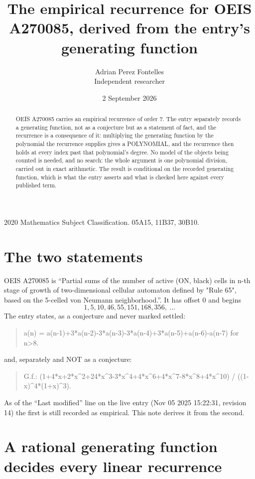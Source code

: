 \documentclass[11pt,a4paper]{article}
\title{The empirical recurrence for OEIS A270085, derived from the entry's generating function}
\author{Adrian Perez Fontelles\\ \small Independent researcher}
\date{2 September 2026}
\theoremstyle{plain}
\theoremstyle{definition}
\begin{document}
\maketitle

\begin{abstract}
OEIS A270085 carries an empirical recurrence of order $7$. The entry separately records a
generating function, not as a conjecture but as a statement of fact, and the recurrence is a
consequence of it: multiplying the generating function by the polynomial the recurrence
supplies gives a POLYNOMIAL, and the recurrence then holds at every index past that
polynomial's degree. No model of the objects being counted is needed, and no search: the
whole argument is one polynomial division, carried out in exact arithmetic. The result is
conditional on the recorded generating function, which is what the entry asserts and what is
checked here against every published term.
\end{abstract}

\noindent\small 2020 Mathematics Subject Classification. 05A15, 11B37, 30B10.\normalsize

\section{The two statements}

OEIS A270085 is ``Partial sums of the number of active (ON, black) cells in n-th stage of growth of two-dimensional cellular automaton defined by "Rule 65", based on the 5-celled von Neumann neighborhood.''. It has offset $0$ and begins
\[
1, 5, 10, 46, 55, 151, 168, 356,\ \dots
\]
The entry states, as a conjecture and never marked settled:
\begin{quote}
a(n) = a(n-1)+3*a(n-2)-3*a(n-3)-3*a(n-4)+3*a(n-5)+a(n-6)-a(n-7) for n>8.
\end{quote}
and, separately and NOT as a conjecture:
\begin{quote}
G.f.: (1+4*x+2*x\^{}2+24*x\^{}3-3*x\^{}4+4*x\^{}6+4*x\^{}7-8*x\^{}8+4*x\^{}10) / ((1-x)\^{}4*(1+x)\^{}3).
\end{quote}
As of the ``Last modified'' line on the live entry (Nov 05 2025 15:22:31, revision 14) the first is still
recorded as empirical. This note derives it from the second.

\section{A rational generating function decides every linear recurrence}
\end{document}
